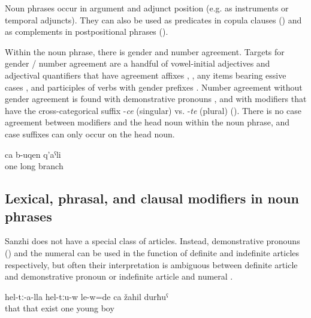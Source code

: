 Noun phrases occur in argument and adjunct position (e.g. as instruments or temporal adjuncts). They can also be used as predicates in copula clauses () and as complements in postpositional phrases ().

Within the noun phrase, there is gender and number agreement. Targets for gender / number agreement are a handful of vowel-initial adjectives  and adjectival quantifiers that have agreement affixes , , any items bearing essive cases ,  and participles of verbs with gender prefixes . Number agreement without gender agreement is found with demonstrative pronouns , and with modifiers that have the cross-categorical suffix -\textit{ce} (singular)  vs. -\textit{te}  (plural) (). There is no case agreement between modifiers and the head noun within the noun phrase, and case suffixes can only occur on the head noun.
%
\begin{exe}
	\ex	\label{ex:a/one long branch@1}
	\gll	ca	b-uqen	q'aˁli\\
		one	long	branch\\
	\glt	{}
\end{exe}



\subsection{Lexical, phrasal, and clausal modifiers in noun phrases}
\label{ssec:Lexical, phrasal, and clausal modifiers in noun phrases}

Sanzhi does not have a special class of articles. Instead, demonstrative pronouns () and the numeral   can be used in the function of definite and indefinite articles respectively, but often their interpretation is ambiguous between definite article and demonstrative pronoun or indefinite article and numeral .
%
\begin{exe}
	\ex	\label{ex:There with them was also a / one young boy@2}
	\gll	hel-tː-a-lla	hel-tːu-w	le-w=de	ca	žahil	durħuˁ\\
		that	that	exist	one	young	boy\\
	\glt	{} 
\end{exe}

